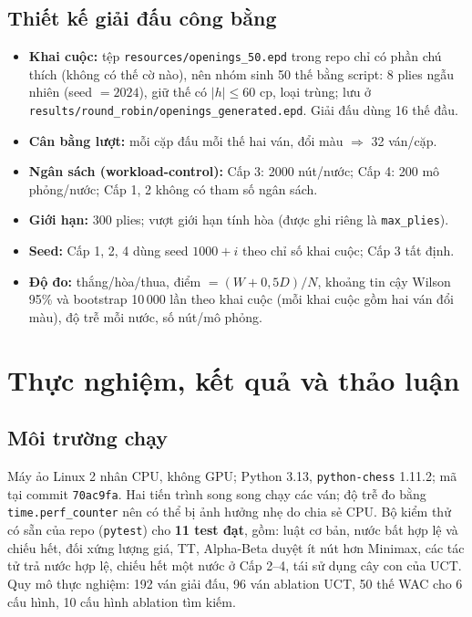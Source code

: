 \documentclass[13pt,a4paper]{extreport}
\newcommand{\code}[1]{\texttt{#1}}
\begin{document}
\section{Thiết kế giải đấu công bằng}\label{sec:fair}
\begin{itemize}
\item \textbf{Khai cuộc:} tệp \code{resources/openings\_50.epd} trong repo chỉ có phần chú thích (không có thế cờ nào), nên nhóm sinh 50 thế bằng script: 8 plies ngẫu nhiên (seed $=2024$), giữ thế có $|h|\le 60$ cp, loại trùng; lưu ở \code{results/round\_robin/openings\_generated.epd}. Giải đấu dùng 16 thế đầu.
\item \textbf{Cân bằng lượt:} mỗi cặp đấu mỗi thế hai ván, đổi màu $\Rightarrow$ 32 ván/cặp.
\item \textbf{Ngân sách (workload-control):} Cấp 3: 2000 nút/nước; Cấp 4: 200 mô phỏng/nước; Cấp 1, 2 không có tham số ngân sách.
\item \textbf{Giới hạn:} 300 plies; vượt giới hạn tính hòa (được ghi riêng là \code{max\_plies}).
\item \textbf{Seed:} Cấp 1, 2, 4 dùng seed $1000+i$ theo chỉ số khai cuộc; Cấp 3 tất định.
\item \textbf{Độ đo:} thắng/hòa/thua, điểm $=(W+0{,}5D)/N$, khoảng tin cậy Wilson 95\% và bootstrap 10\,000 lần theo khai cuộc (mỗi khai cuộc gồm hai ván đổi màu), độ trễ mỗi nước, số nút/mô phỏng.
\end{itemize}

\chapter{Thực nghiệm, kết quả và thảo luận}
\section{Môi trường chạy}
Máy ảo Linux 2 nhân CPU, không GPU; Python 3.13, \code{python-chess} 1.11.2; mã tại commit \code{70ac9fa}. Hai tiến trình song song chạy các ván; độ trễ đo bằng \code{time.perf\_counter} nên có thể bị ảnh hưởng nhẹ do chia sẻ CPU. Bộ kiểm thử có sẵn của repo (\code{pytest}) cho \textbf{11 test đạt}, gồm: luật cơ bản, nước bất hợp lệ và chiếu hết, đối xứng lượng giá, TT, Alpha-Beta duyệt ít nút hơn Minimax, các tác tử trả nước hợp lệ, chiếu hết một nước ở Cấp 2--4, tái sử dụng cây con của UCT. Quy mô thực nghiệm: 192 ván giải đấu, 96 ván ablation UCT, 50 thế WAC cho 6 cấu hình, 10 cấu hình ablation tìm kiếm.
\end{document}
